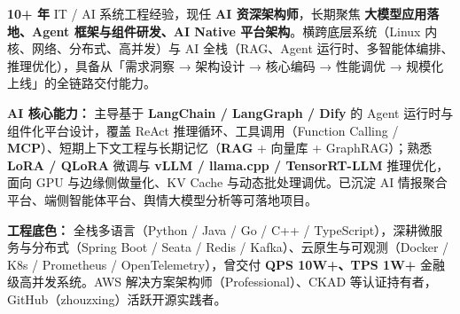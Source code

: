 
\begin{cvparagraph}

\textbf{10+ 年} IT / AI 系统工程经验，现任 \textbf{AI 资深架构师}，长期聚焦 \textbf{大模型应用落地、Agent 框架与组件研发、AI Native 平台架构}。横跨底层系统（Linux 内核、网络、分布式、高并发）与 AI 全栈（RAG、Agent 运行时、多智能体编排、推理优化），具备从「需求洞察 → 架构设计 → 核心编码 → 性能调优 → 规模化上线」的全链路交付能力。

\textbf{AI 核心能力：} 主导基于 \textbf{LangChain / LangGraph / Dify} 的 Agent 运行时与组件化平台设计，覆盖 ReAct 推理循环、工具调用（Function Calling / \textbf{MCP}）、短期上下文工程与长期记忆（\textbf{RAG} + 向量库 + GraphRAG）；熟悉 \textbf{LoRA / QLoRA} 微调与 \textbf{vLLM / llama.cpp / TensorRT-LLM} 推理优化，面向 GPU 与边缘侧做量化、KV Cache 与动态批处理调优。已沉淀 AI 情报聚合平台、端侧智能体平台、舆情大模型分析等可落地项目。

\textbf{工程底色：} 全栈多语言（Python / Java / Go / C++ / TypeScript），深耕微服务与分布式（Spring Boot / Seata / Redis / Kafka）、云原生与可观测（Docker / K8s / Prometheus / OpenTelemetry），曾交付 \textbf{QPS 10W+、TPS 1W+} 金融级高并发系统。AWS 解决方案架构师（Professional）、CKAD 等认证持有者，GitHub（zhouzxing）活跃开源实践者。

\end{cvparagraph}
